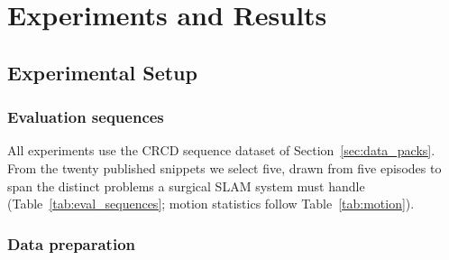 \documentclass{article}
\begin{document}
\section{Experiments and Results}
\subsection{Experimental Setup}
\label{sec:setup}

\subsubsection{Evaluation sequences}

All experiments use the CRCD sequence dataset of Section~\ref{sec:data_packs}. From the twenty published snippets we select five, drawn from five episodes to span the distinct problems a surgical SLAM system must handle (Table~\ref{tab:eval_sequences}; motion statistics follow Table~\ref{tab:motion}).

\begin{table}[!ht]
\centering
\caption{Evaluation sequences and their roles. Frames and motion statistics are taken from Table~\ref{tab:motion}; ``still'' is the fraction of frames below the motion-frame velocity thresholds of Section~\ref{sec:motion_analysis}.}
\label{tab:eval_sequences}


\end{table}



\subsubsection{Data preparation}
\end{document}
